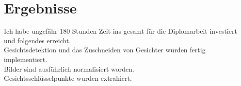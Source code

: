 \section{Ergebnisse}


Ich habe ungefähr 180 Stunden Zeit ins gesamt für die Diplomarbeit investiert und folgendes erreicht.\\ 
Gesichtsdetektion und das Zuschneiden von Gesichter wurden fertig implementiert.\\
Bilder sind ausführlich normalisiert worden.\\
Gesichtsschlüsselpunkte wurden extrahiert.\\

  

